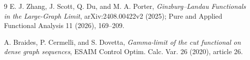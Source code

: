 \documentclass[11pt]{article}
\begin{document}
\begin{thebibliography}{9}
E. J. Zhang, J. Scott, Q. Du, and M. A. Porter,
\emph{Ginzburg--Landau Functionals in the Large-Graph Limit},
arXiv:2408.00422v2 (2025); Pure and Applied Functional Analysis 11 (2026), 169--209.

A. Braides, P. Cermelli, and S. Dovetta,
\emph{Gamma-limit of the cut functional on dense graph sequences},
ESAIM Control Optim. Calc. Var. 26 (2020), article 26.
\end{thebibliography}
\end{document}
